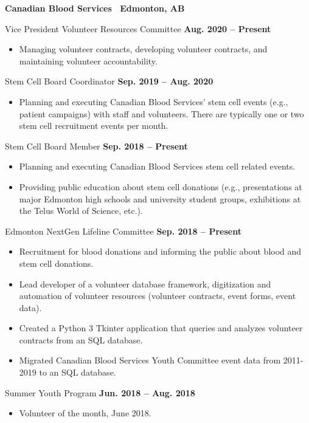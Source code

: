 \documentclass{article}
\begin{document}
    \textbf{Canadian Blood Services \textbar\ Edmonton, AB}

    Vice President Volunteer Resources Committee \hfill \textbf{Aug. 2020 -- Present}
    \begin{itemize}
        \item Managing volunteer contracts, developing volunteer contracts, and maintaining volunteer accountability.
    \end{itemize}

    Stem Cell Board Coordinator \hfill \textbf{Sep. 2019 -- Aug. 2020}
    \begin{itemize}
        \item Planning and executing Canadian Blood Services' stem cell events (e.g., patient campaigns) with staff and volunteers. There are typically one or two stem cell recruitment events per month.
    \end{itemize}

    Stem Cell Board Member \hfill \textbf{Sep. 2018 -- Present}
    \begin{itemize}
        \item Planning and executing Canadian Blood Services stem cell related events.
        \item Providing public education about stem cell donations (e.g., presentations at major Edmonton high schools and university student groups, exhibitions at the Telus World of Science, etc.).
    \end{itemize}

    Edmonton NextGen Lifeline Committee \hfill \textbf{Sep. 2018 -- Present}
    \begin{itemize}
        \item Recruitment for blood donations and informing the public about blood and stem cell donations.
        \item Lead developer of a volunteer database framework, digitization and automation of volunteer resources (volunteer contracts, event forms, event data).
        \item Created a Python 3 Tkinter application that queries and analyzes volunteer contracts from an SQL database.
        \item Migrated Canadian Blood Services Youth Committee event data from 2011-2019 to an SQL database.
    \end{itemize}

    Summer Youth Program \hfill \textbf{Jun. 2018 -- Aug. 2018}
    \begin{itemize}
        \item Volunteer of the month, June 2018.
    \end{itemize}
    
\end{document}
